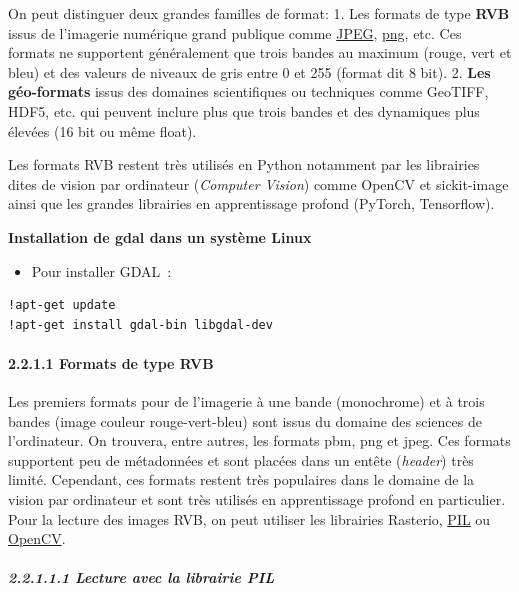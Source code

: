 \documentclass[
]{article}
\providecommand{\tightlist}{%
  \setlength{\itemsep}{0pt}\setlength{\parskip}{0pt}}
\begin{document}
On peut distinguer deux grandes familles de format: 1. Les formats de
type \textbf{RVB} issus de l'imagerie numérique grand publique comme
\href{https://gdal.org/en/latest/drivers/raster/jpeg.html\#raster-jpeg}{JPEG},
\href{https://gdal.org/en/latest/drivers/raster/png.html\#raster-png}{png},
etc. Ces formats ne supportent généralement que trois bandes au maximum
(rouge, vert et bleu) et des valeurs de niveaux de gris entre 0 et 255
(format dit 8 bit). 2. \textbf{Les géo-formats} issus des domaines
scientifiques ou techniques comme GeoTIFF, HDF5, etc. qui peuvent
inclure plus que trois bandes et des dynamiques plus élevées (16 bit ou
même float).

Les formats RVB restent très utilisés en Python notamment par les
librairies dites de vision par ordinateur (\emph{Computer Vision}) comme
OpenCV et sickit-image ainsi que les grandes librairies en apprentissage
profond (PyTorch, Tensorflow).

\textbf{Installation de gdal dans un système Linux}

\begin{itemize}
\tightlist
\item
  Pour installer GDAL~:
\end{itemize}

\begin{verbatim}
!apt-get update
!apt-get install gdal-bin libgdal-dev
\end{verbatim}

\paragraph{\texorpdfstring{{2.2.1.1} Formats de type
RVB}{2.2.1.1 Formats de type RVB}}\label{formats-de-type-rvb}

Les premiers formats pour de l'imagerie à une bande (monochrome) et à
trois bandes (image couleur rouge-vert-bleu) sont issus du domaine des
sciences de l'ordinateur. On trouvera, entre autres, les formats pbm,
png et jpeg. Ces formats supportent peu de métadonnées et sont placées
dans un entête (\emph{header}) très limité. Cependant, ces formats
restent très populaires dans le domaine de la vision par ordinateur et
sont très utilisés en apprentissage profond en particulier. Pour la
lecture des images RVB, on peut utiliser les librairies Rasterio,
\href{https://he-arc.github.io/livre-python/pillow/index.html}{PIL} ou
\href{https://docs.opencv.org/4.10.0/index.html}{OpenCV}.

\subparagraph{\texorpdfstring{{2.2.1.1.1} Lecture avec la librairie
PIL}{2.2.1.1.1 Lecture avec la librairie PIL}}\label{lecture-avec-la-librairie-pil}
\end{document}
